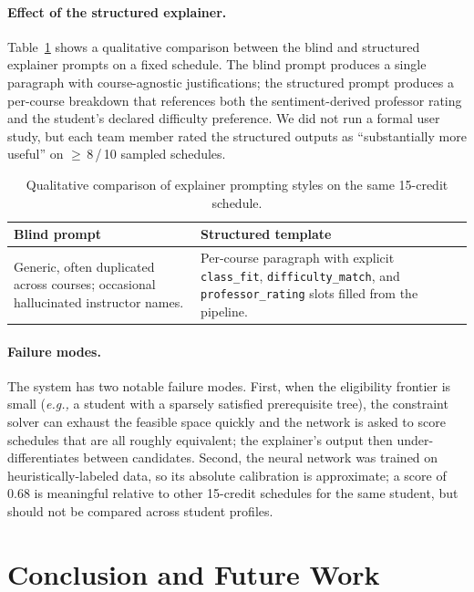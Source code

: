 \documentclass[10pt,letterpaper]{article}
\newcommand{\code}[1]{\texttt{\small #1}}
\newcommand{\eg}{\emph{e.g.,}}
\begin{document}
\paragraph{Effect of the structured explainer.}
Table~\ref{tab:explainer} shows a qualitative comparison between the blind
and structured explainer prompts on a fixed schedule. The blind prompt
produces a single paragraph with course-agnostic justifications; the
structured prompt produces a per-course breakdown that references both the
sentiment-derived professor rating and the student's declared difficulty
preference. We did not run a formal user study, but each team member rated
the structured outputs as ``substantially more useful'' on
$\geq$\,8\,/\,10 sampled schedules.

\begin{table}[t]
  \centering
  \small
  \caption{Qualitative comparison of explainer prompting styles on the
    same 15-credit schedule.}
  \label{tab:explainer}
  \begin{tabular}{p{} p{}}
    \toprule
    \textbf{Blind prompt} & \textbf{Structured template} \\
    \midrule
    Generic, often
    duplicated across courses; occasional hallucinated instructor names. &
    Per-course paragraph with explicit \code{class\_fit},
    \code{difficulty\_match}, and \code{professor\_rating} slots filled
    from the pipeline. \\
    \bottomrule
  \end{tabular}
\end{table}

\paragraph{Failure modes.} The system has two notable failure modes.
First, when the eligibility frontier is small (\eg{} a student with a
sparsely satisfied prerequisite tree), the constraint solver can exhaust
the feasible space quickly and the network is asked to score schedules
that are all roughly equivalent; the explainer's output then under-
differentiates between candidates. Second, the neural network was trained
on heuristically-labeled data, so its absolute calibration is approximate;
a score of 0.68 is meaningful relative to other 15-credit schedules for
the same student, but should not be compared across student profiles.

\section{Conclusion and Future Work}
\label{sec:conclusion}
\end{document}
